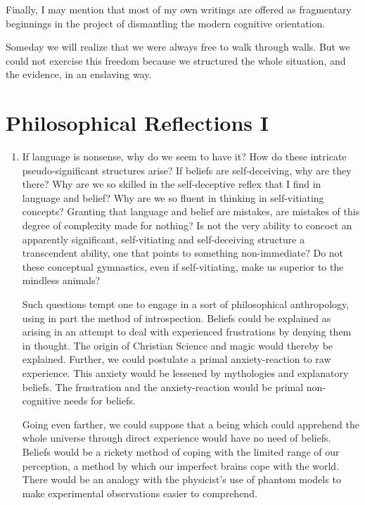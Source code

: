 \documentclass[10pt,twoside,draft]{memoir}
\begin{document}
Finally, I may mention that most of my own writings are offered as 
fragmentary beginnings in the project of dismantling the modern cognitive 
orientation. 

Someday we will realize that we were always free to walk through 
walls. But we could not exercise this freedom because we structured the 
whole situation, and the evidence, in an enslaving way. 

\chapter{Philosophical Reflections I}

\begin{enumerate} %
\item If language is nonsense, why do we seem to have it? How do these 
intricate pseudo-significant structures arise? If beliefs are self-deceiving, why 
are they there? Why are we so skilled in the self-deceptive reflex that I find 
in language and belief? Why are we so fluent in thinking in self-vitiating 
concepts? Granting that language and belief are mistakes, are mistakes of 
this degree of complexity made for nothing? Is not the very ability to 
concoct an apparently significant, self-vitiating and self-deceiving structure a 
transcendent ability, one that points to something non-immediate? Do not 
these conceptual gymnastics, even if self-vitiating, make us superior to the 
mindless animals? 

Such questions tempt one to engage in a sort of philosophical 
anthropology, using in part the method of introspection. Beliefs could be 
explained as arising in an attempt to deal with experienced frustrations by 
denying them in thought. The origin of Christian Science and magic would 
thereby be explained. Further, we could postulate a primal anxiety-reaction 
to raw experience. This anxiety would be lessened by mythologies and 
explanatory beliefs. The frustration and the anxiety-reaction would be 
primal non-cognitive needs for beliefs. 

Going even farther, we could suppose that a being which could 
apprehend the whole universe through direct experience would have no need 
of beliefs. Beliefs would be a rickety method of coping with the limited 
range of our perception, a method by which our imperfect brains cope with 
the world. There would be an analogy with the physicist's use of phantom 
models to make experimental observations easier to comprehend. 


\end{enumerate}
\end{document}
